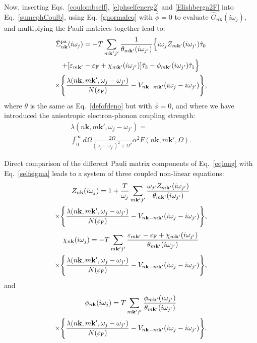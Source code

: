\documentclass[final,3p,times,twocolumn]{elsarticle}
\begin{document}
Now, inserting Eqs.~\eqref{coulombself}, \eqref{elphselfenerg2} and \eqref{Elishberga2F} into Eq.~\eqref{sumephCoulb}, using Eq.~\eqref{gnormaleq} with $\bar{\phi}=0$ to evaluate $\hat{G}_{n\mathbf{k}}(i\omega_j)$, 
and multiplying the Pauli matrices together lead to: 
\begin{multline}\label{eqlong}
\hat{\Sigma}_{n\mathbf{k}}^{\text{pa}} (i\omega_j) = -T \sum_{m\mathbf{k'}j'} \frac{1}{\theta_{m\mathbf{k'}}(i\omega_{j'})}\Big\{ i\omega_j Z_{m\bf{k'}}(i\omega_{j'})\hat{\tau}_0 \\
+[\varepsilon_{m\bf{k'}}-\varepsilon_{\rm F} +\chi_{m\bf{k'}}(i\omega_{j'})]\hat{\tau}_3  - \phi_{m\bf{k'}}(i\omega_{j'})\hat{\tau}_1 \Big\} \\
\times \Bigg\{\frac{\lambda(n\mathbf{k},m\mathbf{k'},\omega_j-\omega_{j'})}{N(\varepsilon_{\rm F})} -  V_{n\mathbf{k}-m\mathbf{k'}}(i\omega_j-i\omega_{j'})\Bigg\},
\end{multline}
where $\theta$ is the same as Eq.~\eqref{defofdeno} but with $\bar{\phi}=0$, and where we have introduced the anisotropic electron-phonon coupling strength:
\begin{multline}\label{couplingstrengthbase}
    \lambda(n\mathbf{k},m\mathbf{k'},\omega_j-\omega_{j'}) =\\
     \int_0^{\infty} d\Omega \frac{2\Omega}{(\omega_j-\omega_{j'})^2+\Omega^2} \alpha^2 F(n\mathbf{k},m\mathbf{k'},\Omega). 
\end{multline}  

Direct comparison of the different Pauli matrix components of Eq.~\eqref{eqlong} with Eq.~\eqref{selfsigma} leads to a system of three coupled non-linear equations:
\begin{multline}\label{firstequ}
Z_{n\mathbf{k}}(i\omega_j) = 1 + \frac{T}{\omega_j} \sum_{m\mathbf{k'}j'} \frac{\omega_{j'}Z_{m\mathbf{k'}}(i\omega_{j'})}{\theta_{m\mathbf{k'}}(i\omega_{j'})}\\
\times \Bigg\{\frac{\lambda(n\mathbf{k},m\mathbf{k'},\omega_j-\omega_{j'})}{N(\varepsilon_{\rm F})} -  V_{n\mathbf{k}-m\mathbf{k'}}(i\omega_j-i\omega_{j'})\Bigg\},
\end{multline}
\begin{multline}\label{secondeq}
\chi_{n\mathbf{k}}(i\omega_j) = -T \sum_{m\mathbf{k'}j'} \frac{\varepsilon_{m\mathbf{k'}}-\varepsilon_{\rm F}+\chi_{m\mathbf{k'}}(i\omega_{j'})}{\theta_{m\mathbf{k'}}(i\omega_{j'})}\\
\times \Bigg\{\frac{\lambda(n\mathbf{k},m\mathbf{k'},\omega_j-\omega_{j'})}{N(\varepsilon_{\rm F})} -  V_{n\mathbf{k}-m\mathbf{k'}}(i\omega_j-i\omega_{j'})\Bigg\},
\end{multline}
and
\begin{multline}\label{thirdone}
\phi_{n\mathbf{k}}(i\omega_j) = T \sum_{m\mathbf{k'}j'} \frac{\phi_{m\mathbf{k'}}(i\omega_{j'})}{\theta_{m\mathbf{k'}}(i\omega_{j'})}\\
\times \Bigg\{\frac{\lambda(n\mathbf{k},m\mathbf{k'},\omega_j-\omega_{j'})}{N(\varepsilon_{\rm F})} -  V_{n\mathbf{k}-m\mathbf{k'}}(i\omega_j-i\omega_{j'})\Bigg\}.
\end{multline}
\end{document}
